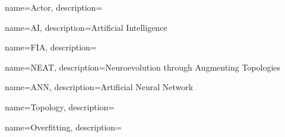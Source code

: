 {
    name=Actor,
    description={}
}

{
    name=AI,
    description={Artificial Intelligence}
}

{
    name=FIA,
    description={}
}

{
    name=NEAT,
    description={Neuroevolution through Augmenting Topologies}
}

{
    name={ANN},
    description={Artificial Neural Network}
}


{
    name=Topology,
    description={}
}

{
    name=Overfitting,
    description={}
}


\glsaddall
\clearpage
\printglossary[title=Vocabulary, toctitle=Vocabulary]

